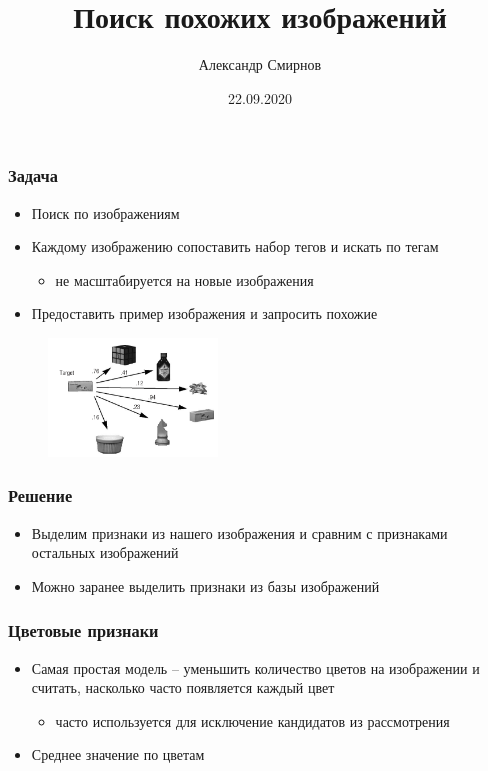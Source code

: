 \documentclass[xetex,mathserif,serif]{beamer}
\title{Поиск похожих изображений}
\author[Александр Смирнов]{Александр Смирнов}
\date{22.09.2020}
\begin{document}
\begin{frame}
	\titlepage{}
\end{frame}


\begin{frame}
	\frametitle{Задача}


	\begin{itemize}
		\item Поиск по изображениям
		\item Каждому изображению сопоставить набор тегов и искать по тегам
		      \begin{itemize}
			      \item не масштабируется на новые изображения
		      \end{itemize}
		\item Предоставить пример изображения и запросить похожие
	\end{itemize}

	\begin{figure}[b]
		\includegraphics[width=0.4\textwidth]{./images/query_sample.png}
		\centering
	\end{figure}




\end{frame}






\begin{frame}
	\frametitle{Решение}

	\begin{itemize}
		\item Выделим признаки из нашего изображения и сравним с признаками остальных изображений
		\item Можно заранее выделить признаки из базы изображений
	\end{itemize}
\end{frame}



\begin{frame}
	\frametitle{Цветовые признаки}

	\begin{itemize}
		\item Самая простая модель -- уменьшить количество цветов на изображении и считать, насколько часто появляется каждый цвет
		      \begin{itemize}
			      \item часто используется для исключение кандидатов из рассмотрения
		      \end{itemize}
		\item Среднее значение по цветам
	\end{itemize}
\end{frame}
\end{document}
